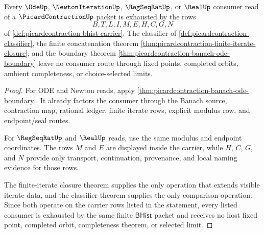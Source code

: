\begin{theorem}
\label{thm:picardcontraction-finite-consumer-exhaustion}
Every $\OdeUp$, $\NewtonIterationUp$, $\RegSeqRatUp$, or $\RealUp$ consumer read of a $\PicardContractionUp$ packet is exhausted by the rows
$$
B,T,L,I,M,E,H,C,G,N
$$
of \autoref{def:picardcontraction-bhist-carrier}. The classifier of \autoref{def:picardcontraction-classifier}, the finite concatenation theorem \autoref{thm:picardcontraction-finite-iterate-closure}, and the boundary theorem \autoref{thm:picardcontraction-banach-ode-boundary} leave no consumer route through fixed points, completed orbits, ambient completeness, or choice-selected limits.
\end{theorem}
\begin{proof}
For ODE and Newton reads, apply \autoref{thm:picardcontraction-banach-ode-boundary}. It already factors the consumer through the Banach source, contraction map, rational ledger, finite iterate rows, explicit modulus row, and endpoint/seal routes.

For $\RegSeqRatUp$ and $\RealUp$ reads, use the same modulus and endpoint coordinates. The rows $M$ and $E$ are displayed inside the carrier, while $H$, $C$, $G$, and $N$ provide only transport, continuation, provenance, and local naming evidence for those rows.

The finite-iterate closure theorem supplies the only operation that extends visible iterate data, and the classifier theorem supplies the only comparison operation. Since both operate on the carrier rows listed in the statement, every listed consumer is exhausted by the same finite $\mathsf{BHist}$ packet and receives no host fixed point, completed orbit, completeness theorem, or selected limit.
\end{proof}


